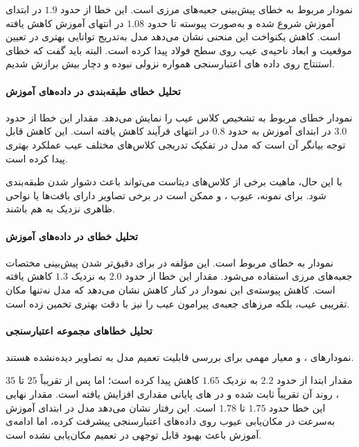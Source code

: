 \documentclass[a4paper, 10pt, twocolumn]{article}
\begin{document}
	نمودار  مربوط به خطای پیش‌بینی جعبه‌های مرزی است. این خطا از حدود $1.9$ در ابتدای آموزش شروع شده و به‌صورت پیوسته تا حدود $1.08$ در انتهای آموزش کاهش یافته است. کاهش یکنواخت این منحنی نشان می‌دهد مدل به‌تدریج توانایی بهتری در تعیین موقعیت و ابعاد ناحیه‌ی عیب روی سطح فولاد پیدا کرده است.
	البته باید گفت که خطای استنتاج روی داده های اعتبارسنجی همواره نزولی نبوده و دچار بیش برازش شدیم.
	\paragraph{تحلیل خطای طبقه‌بندی در داده‌های آموزش}
	
	نمودار  خطای مربوط به تشخیص کلاس عیب را نمایش می‌دهد. مقدار این خطا از حدود $3.0$ در ابتدای آموزش به حدود $0.8$ در انتهای فرآیند کاهش یافته است. این کاهش قابل توجه بیانگر آن است که مدل در تفکیک تدریجی کلاس‌های مختلف عیب عملکرد بهتری پیدا کرده است.
	
	با این حال، ماهیت برخی از کلاس‌های دیتاست  می‌تواند باعث دشوار شدن طبقه‌بندی شود. برای نمونه، عیوب ،  و  ممکن است در برخی تصاویر دارای بافت‌ها یا نواحی ظاهری نزدیک به هم باشند.
	
	\paragraph{تحلیل خطای  در داده‌های آموزش}
	
	نمودار  به خطای  مربوط است. این مؤلفه در  برای دقیق‌تر شدن پیش‌بینی مختصات جعبه‌های مرزی استفاده می‌شود. مقدار این خطا از حدود $2.0$ به نزدیک $1.3$ کاهش یافته است. کاهش پیوسته‌ی این نمودار در کنار کاهش  نشان می‌دهد که مدل نه‌تنها مکان تقریبی عیب، بلکه مرزهای جعبه‌ی پیرامون عیب را نیز با دقت بهتری تخمین زده است.
	
	\paragraph{تحلیل خطاهای مجموعه اعتبارسنجی}
	
	نمودارهای ،  و  معیار مهمی برای بررسی قابلیت تعمیم مدل به تصاویر دیده‌نشده هستند.
	
	مقدار  ابتدا از حدود $2.2$ به نزدیک $1.65$ کاهش پیدا کرده است؛ اما پس از تقریباً  $25$ تا $35$ ، روند آن تقریباً ثابت شده و در های پایانی مقداری افزایش یافته است. مقدار نهایی این خطا حدود $1.75$ تا $1.78$ است. این رفتار نشان می‌دهد مدل در ابتدای آموزش به‌سرعت در مکان‌یابی عیوب روی داده‌های اعتبارسنجی پیشرفت کرده، اما ادامه‌ی آموزش باعث بهبود قابل توجهی در تعمیم مکان‌یابی نشده است.
	
\end{document}
